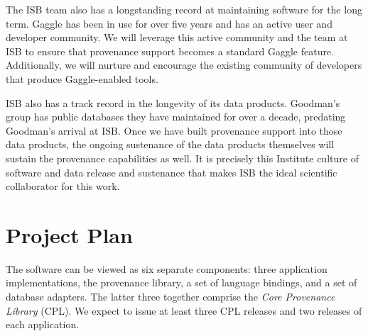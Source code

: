 \documentclass[10pt]{article}
\begin{document}
The ISB team also has a longstanding record at maintaining software
for the long term.
Gaggle has been in use for over five years and has an active user and
developer community.
We will leverage this active community and the team at ISB to ensure
that provenance support becomes a standard Gaggle feature.
Additionally, we will nurture and encourage the existing community of
developers that produce Gaggle-enabled tools.

ISB also has a track record in the longevity of its data products.
Goodman's group has public databases they have maintained for over
a decade, predating Goodman's arrival at ISB.
Once we have built provenance support into those data products,
the ongoing sustenance of the data products themselves will sustain
the provenance capabilities as well.
It is precisely this Institute culture of software and data release and
sustenance that makes ISB the ideal scientific collaborator for this work.

\section{Project Plan}


The software can be viewed as six separate components: three
application implementations, the provenance library, a set of
language bindings, and a set of database adapters. The latter three
together comprise the \emph{Core Provenance Library} (CPL). We expect to issue
at least three CPL releases and two releases of each application.
\end{document}
